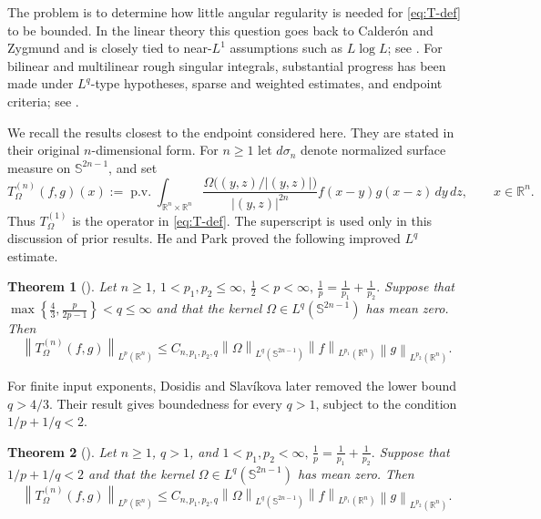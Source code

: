 \documentclass[11pt]{amsart}
\newtheorem{priorresult}{Theorem}
\theoremstyle{remark}
\numberwithin{equation}{section}
\newcommand{\pv}{\operatorname{p.v.}}
\newcommand{\R}{\mathbb R}
\newcommand{\norm}[1]{\left\lVert #1\right\rVert}
\begin{document}
	The problem is to determine how little angular regularity is needed for
	\eqref{eq:T-def} to be bounded.  In the linear theory this question goes back
	to Calder\'on and Zygmund and is closely tied to near-\(L^1\) assumptions such
	as \(L\log L\); see
	\cite{CalderonZygmund1956,DuoandikoetxeaRubio1986,Christ1988,Seeger1996,
		GrafakosStefanov1998,Tao1999}.  For bilinear and multilinear rough singular
	integrals, substantial progress has been made under \(L^q\)-type hypotheses,
	sparse and weighted estimates, and endpoint criteria; see
	\cite{CoifmanMeyer1975,GrafakosHeHonzik2018,GrafakosHeSlavikova2020,
		Barron2017,GrafakosWangXue2022,HePark2023,
		GrafakosHeHonzikPark2023}.
	
	We recall the results closest to the endpoint considered here.  They are stated
	in their original \(n\)-dimensional form.  For \(n\ge1\) let
	\(d\sigma_n\) denote normalized surface measure on \(\mathbb S^{2n-1}\), and set
	\[
	T_\Omega^{(n)}(f,g)(x)
	:=
	\pv\int_{\R^n\times\R^n}
	\frac{\Omega\bigl((y,z)/|(y,z)|\bigr)}{|(y,z)|^{2n}}
	f(x-y)g(x-z)\,dy\,dz,
	\qquad x\in\R^n.
	\]
	Thus \(T_\Omega^{(1)}\) is the operator in \eqref{eq:T-def}.  The superscript is
	used only in this discussion of prior results.
	He and Park proved the following improved \(L^q\) estimate.
	\begin{priorresult}[\cite{HePark2023}]
		\label{thm:prior-A}
		Let \(n\ge1\),
		$
		1<p_1,p_2\le\infty,
		\,
		\frac12<p<\infty,
		\,
		\frac1p=\frac1{p_1}+\frac1{p_2}.$
		Suppose that
		$\max\left\{\frac43,\frac{p}{2p-1}\right\}<q\le\infty$
		and that the kernel
		\(\Omega\in L^q(\mathbb S^{2n-1})\) has mean zero. 
		Then
		\[	
		\norm{T_\Omega^{(n)}(f,g)}_{L^p(\R^n)}
		\le
		C_{n,p_1,p_2,q}\norm{\Omega}_{L^q(\mathbb S^{2n-1})}
		\norm f_{L^{p_1}(\R^n)}\norm g_{L^{p_2}(\R^n)}.
		\]
	\end{priorresult}
	
	For finite input exponents, Dosidis and Slav\'ikova later removed the lower
	bound \(q>4/3\).  Their result gives boundedness for every \(q>1\), subject to
	the condition \(1/p+1/q<2\).
	
	\begin{priorresult}[\cite{dosidis_multilinear_2024}]
		\label{thm:prior-B}
		Let \(n\ge1\), \(q>1\), and $
		1<p_1,p_2<\infty,
		\,
		\frac1p=\frac1{p_1}+\frac1{p_2}.
		$
		Suppose that \(1/p+1/q<2\) and that the kernel
		\(\Omega\in L^q(\mathbb S^{2n-1})\) has mean zero.  Then
		\[
		\norm{T_\Omega^{(n)}(f,g)}_{L^p(\R^n)}
		\le
		C_{n,p_1,p_2,q}\norm{\Omega}_{L^q(\mathbb S^{2n-1})}
		\norm f_{L^{p_1}(\R^n)}\norm g_{L^{p_2}(\R^n)}.
		\]
	\end{priorresult}
	
\end{document}
